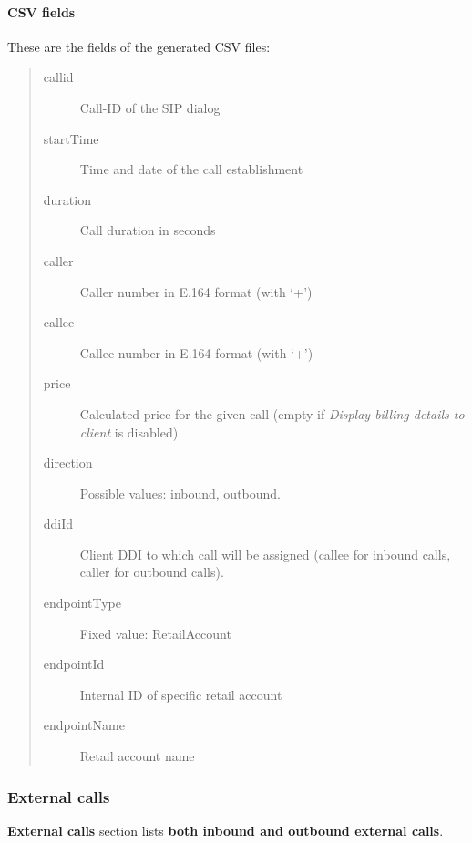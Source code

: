 \documentclass[letterpaper,10pt,spanish]{sphinxmanual}
\begin{document}
\paragraph{CSV fields}
\label{administration_portal/client/retail/calls/call_csv_schedulers:csv-fields}
These are the fields of the generated CSV files:
\begin{quote}
\begin{description}
\item[{callid}] \leavevmode
Call-ID of the SIP dialog

\item[{startTime}] \leavevmode
Time and date of the call establishment

\item[{duration}] \leavevmode
Call duration in seconds

\item[{caller}] \leavevmode
Caller number in E.164 format (with `+')

\item[{callee}] \leavevmode
Callee number in E.164 format (with `+')

\item[{price}] \leavevmode
Calculated price for the given call (empty if \emph{Display billing details to client} is disabled)

\item[{direction}] \leavevmode
Possible values: inbound, outbound.

\item[{ddiId}] \leavevmode
Client DDI to which call will be assigned (callee for inbound calls, caller for outbound calls).

\item[{endpointType}] \leavevmode
Fixed value: RetailAccount

\item[{endpointId}] \leavevmode
Internal ID of specific retail account

\item[{endpointName}] \leavevmode
Retail account name

\end{description}
\end{quote}


\subsubsection{External calls}
\label{administration_portal/client/retail/calls/call_recordings::doc}\label{administration_portal/client/retail/calls/call_recordings:external-calls}
\textbf{External calls} section lists \textbf{both inbound and outbound external calls}.
\end{document}
